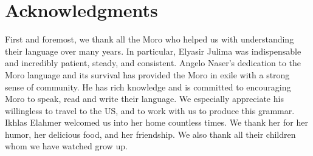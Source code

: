 \section{Acknowledgments}
First and foremost, we thank all the Moro who helped us with understanding their language over many years. In particular, Elyasir Julima was indispensable and incredibly patient, steady, and consistent. Angelo Naser's dedication to the Moro language and its survival has provided the Moro in exile with a strong sense of community. He has rich knowledge and is committed to encouraging Moro to speak, read and write their language. We especially appreciate his willingless to travel to the US, and to work with us to produce this grammar. Ikhlas Elahmer welcomed us into her home countless times. We thank her for her humor, her delicious food, and her friendship. We also thank all their children whom we have watched grow up. 

%
%
%
%
%
